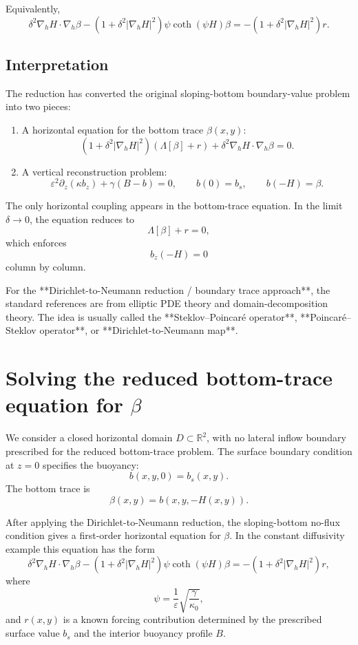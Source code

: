 \documentclass[11pt]{amsart}
\begin{document}
Equivalently,
\[
\boxed{
\delta^2 \nabla_h H\cdot \nabla_h \beta
-
\left(1+\delta^2 |\nabla_h H|^2\right)
\psi \coth(\psi H)\beta
=
-
\left(1+\delta^2 |\nabla_h H|^2\right)r.
}
\]

\subsection{Interpretation}

The reduction has converted the original sloping-bottom boundary-value problem into two pieces:

\begin{enumerate}
    \item A horizontal equation for the bottom trace \(\beta(x,y)\):
    \[
    \left(1+\delta^2 |\nabla_h H|^2\right)
    \left(\Lambda[\beta]+r\right)
    +
    \delta^2 \nabla_h H\cdot \nabla_h \beta
    =0.
    \]

    \item A vertical reconstruction problem:
    \[
    \varepsilon^2 \partial_z(\kappa b_z)+\gamma(B-b)=0,
    \qquad
    b(0)=b_s,
    \qquad
    b(-H)=\beta.
    \]
\end{enumerate}

The only horizontal coupling appears in the bottom-trace equation. In the limit \(\delta\to 0\), the equation reduces to
\[
\Lambda[\beta]+r=0,
\]
which enforces
\[
b_z(-H)=0
\]
column by column.

For the **Dirichlet-to-Neumann reduction / boundary trace approach**, the standard references are from elliptic PDE theory and domain-decomposition theory. The idea is usually called the **Steklov–Poincaré operator**, **Poincaré–Steklov operator**, or **Dirichlet-to-Neumann map**.

\section{Solving the reduced bottom-trace equation for $\beta$}

We consider a closed horizontal domain \(D\subset\mathbb{R}^2\), with no lateral
inflow boundary prescribed for the reduced bottom-trace problem. The surface
boundary condition at \(z=0\) specifies the buoyancy:
\[
b(x,y,0)=b_s(x,y).
\]
The bottom trace is
\[
\beta(x,y)=b(x,y,-H(x,y)).
\]

After applying the Dirichlet-to-Neumann reduction, the sloping-bottom no-flux
condition gives a first-order horizontal equation for \(\beta\). In the constant
diffusivity example this equation has the form
\[
\delta^2 \nabla_h H\cdot \nabla_h \beta
-
\left(1+\delta^2 |\nabla_h H|^2\right)
\psi \coth(\psi H)\beta
=
-
\left(1+\delta^2 |\nabla_h H|^2\right)r,
\]
where
\[
\psi=\frac{1}{\varepsilon}\sqrt{\frac{\gamma}{\kappa_0}},
\]
and \(r(x,y)\) is a known forcing contribution determined by the prescribed
surface value \(b_s\) and the interior buoyancy profile \(B\).
\end{document}
